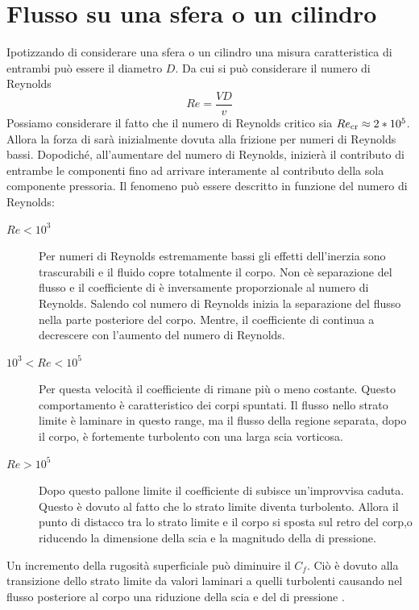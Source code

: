 \section{Flusso su una sfera o un cilindro}
Ipotizzando di considerare una sfera o un cilindro una misura caratteristica di entrambi può essere il diametro $D$.
Da cui si può considerare il numero di Reynolds 
\begin{equation}
Re = \frac{VD}{v}
\end{equation} 
Possiamo considerare il fatto che il numero di Reynolds critico sia $Re_{\textup{cr}} \approx 2*10^5$.
Allora la forza di  sarà inizialmente dovuta alla frizione per numeri di Reynolds bassi. Dopodiché, all'aumentare del numero di Reynolds, inizierà il contributo di entrambe le componenti fino ad arrivare interamente al contributo della sola componente pressoria.
Il fenomeno può essere descritto in funzione del numero di Reynolds:
\begin{description}
\item[$Re < 10^3$]Per numeri di Reynolds estremamente bassi gli effetti dell'inerzia sono trascurabili e il fluido copre totalmente il corpo. Non cè separazione del flusso e il coefficiente di  è inversamente proporzionale al numero di Reynolds. Salendo col numero di Reynolds inizia la separazione del flusso nella parte posteriore del corpo. Mentre, il coefficiente di  continua a decrescere con l'aumento del numero di Reynolds. 
\item[$10^3 < Re < 10^5$] Per questa velocità il coefficiente di  rimane più o meno costante. Questo comportamento è caratteristico dei corpi spuntati. Il flusso nello strato limite è laminare in questo range, ma il flusso della regione separata, dopo il corpo, è fortemente turbolento con una larga scia vorticosa.
\item[$Re > 10^5$]Dopo questo pallone limite il coefficiente di  subisce un'improvvisa caduta. Questo è dovuto al fatto che lo strato limite diventa turbolento. Allora il punto di distacco tra lo strato limite e il corpo si sposta sul retro del corp,o riducendo la dimensione della scia e la magnitudo della  di pressione. 
\end{description} 

Un incremento della rugosità superficiale può diminuire il $C_f$. Ciò è dovuto  alla transizione dello strato limite da valori laminari a quelli turbolenti causando nel flusso posteriore al corpo una riduzione della scia e del  di pressione . 

